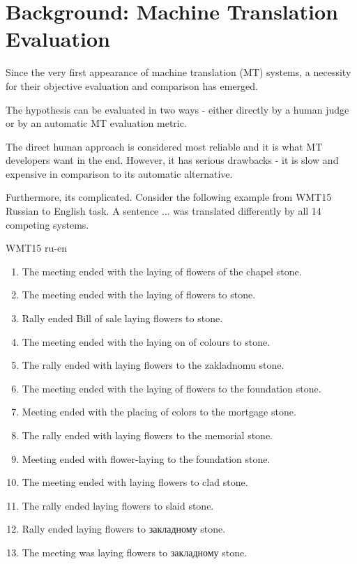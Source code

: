 \chapter{Background: Machine Translation Evaluation}

Since the very first appearance of machine translation (MT) systems, a necessity for their objective evaluation and comparison has emerged.

The hypothesis can be evaluated in two ways - either directly by a human judge or by an automatic MT evaluation metric.

The direct human approach is considered most reliable and it is what MT developers want in the end. However, it has serious drawbacks - it is slow and expensive in comparison to its automatic alternative.

Furthermore, its complicated. Consider the following example from WMT15 Russian to English task. A sentence ... was translated differently by all 14 competing systems.   

WMT15 ru-en
\begin{enumerate}
\item The meeting ended with the laying of flowers of the chapel stone.
\item The meeting ended with the laying of flowers to stone.
\item Rally ended Bill of sale laying flowers to stone.
\item The meeting ended with the laying on of colours to stone.
\item The rally ended with laying flowers to the zakladnomu stone.
\item The meeting ended with the laying of flowers to the foundation stone.
\item Meeting ended with the placing of colors to the mortgage stone.
\item The rally ended with laying flowers to the memorial stone.
\item Meeting ended with flower-laying to the foundation stone.
\item The meeting ended with laying flowers to clad stone.
\item The rally ended laying flowers to slaid stone.
\item Rally ended laying flowers to закладному stone.
\item The meeting was laying flowers to закладному stone.
\end{enumerate}

